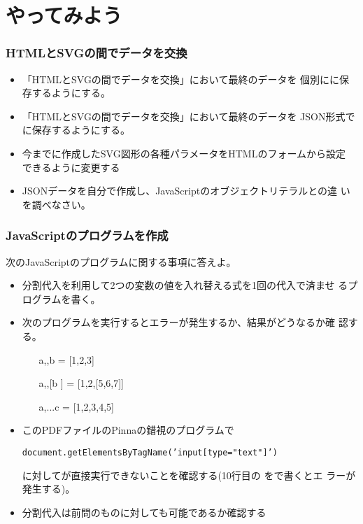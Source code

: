 \section{やってみよう}
\begin{frame}[containsverbatim]
 \frametitle{HTMLとSVGの間でデータを交換}
 \begin{itemize}
	\item 「HTMLとSVGの間でデータを交換」において最終のデータを
				個別にに保存するようにする。
	\item 「HTMLとSVGの間でデータを交換」において最終のデータを
				JSON形式でに保存するようにする。
	\item 今までに作成したSVG図形の各種パラメータをHTMLのフォームから設定
				できるように変更する
	\item JSONデータを自分で作成し、JavaScriptのオブジェクトリテラルとの違
				いを調べなさい。
 \end{itemize}
\end{frame}
\begin{frame}[containsverbatim]
 \frametitle{JavaScriptのプログラムを作成}
 次のJavaScriptのプログラムに関する事項に答えよ。
 \begin{itemize}
	\item 分割代入を利用して2つの変数の値を入れ替える式を1回の代入で済ませ
				るプログラムを書く。
	\item 次のプログラムを実行するとエラーが発生するか、結果がどうなるか確
				認する。
				\begin{itemize}
				 \item [a,,b]= [1,2,3]
				 \item [a,,[b]] = [1,2,[5,6,7]]
				 \item [a,...c] = [1,2,3,4,5]
				\end{itemize}
	\item このPDFファイルのPinnaの錯視のプログラムで

				\texttt{document.getElementsByTagName('input[type="text"]')}

				に対してが直接実行できないことを確認する(10行目の
				をで書くとエ
				ラーが発生する)。
	\item 分割代入は前問のものに対しても可能であるか確認する
 \end{itemize}
\end{frame}

\begin{frame}[containsverbatim]
\frametitle{}
\end{frame}
